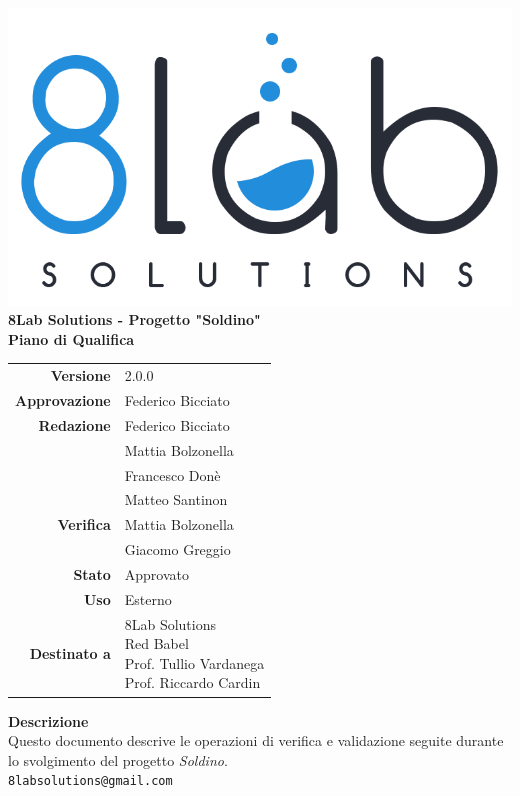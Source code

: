 \thispagestyle{empty}
\begin{titlepage}
	\begin{center}
		\includegraphics[scale = 0.3]{res/images/logo8_crop.png}\\
		\large \textbf{8Lab Solutions - Progetto "Soldino"} \\
		\vfill
		\Huge \textbf{Piano di Qualifica}
		\vspace*{\fill} 
        \vfill
        \large
        \begin{tabular}{r|l}
                        \textbf{Versione} & 2.0.0\\
                        \textbf{Approvazione} & Federico Bicciato\\
                        \textbf{Redazione} &
                        	Federico Bicciato\\&
                        	Mattia Bolzonella\\&
                        	Francesco Donè\\&
                        	Matteo Santinon\\
                        \textbf{Verifica} &
                        	Mattia Bolzonella \\&
                        	Giacomo Greggio \\
                        \textbf{Stato} & Approvato\\
                        \textbf{Uso} & Esterno\\
                        \textbf{Destinato a} & \parbox[t]{5cm}{8Lab Solutions\\Red Babel\\Prof. Tullio Vardanega\\Prof. Riccardo Cardin}
                \end{tabular}
                \vfill
                \normalsize
                \textbf{Descrizione}\\
                Questo documento descrive le operazioni di verifica e validazione seguite durante lo svolgimento del progetto \textit{Soldino}.\\
                \vfill
                \small
                \texttt{8labsolutions@gmail.com}
	\end{center}
\end{titlepage}